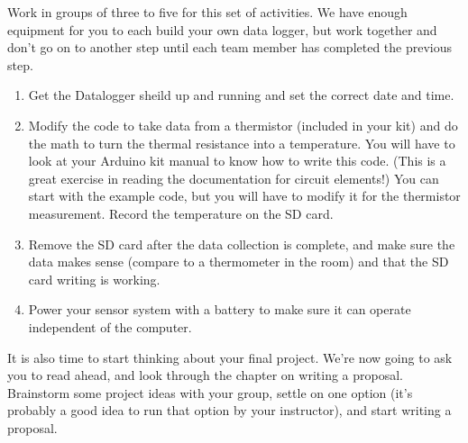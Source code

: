 \activity
{
Work in groups of three to five for this set of activities. We have enough 
equipment for you to each build your own data logger, but work together and 
don't go on to another step until each team member has completed the previous 
step.
\begin{enumerate}
\item Get the Datalogger sheild up and running and set the correct date and 
	time.
\item Modify the code to take data from a thermistor (included in your kit) 
and do the math to turn the thermal resistance into a temperature. You will 
have to look at your Arduino kit manual to know how to write this code. (This 
is a great exercise in reading the documentation for circuit elements!) You 
can start with the example code, but you will have to modify it for the 
thermistor measurement. Record the temperature on the SD card.
	
\item Remove the SD card after the data collection is complete, and make sure 
	the data makes sense (compare to a thermometer in the room) and that 
	the SD card writing is working.
		
\item Power your sensor system with a battery to make sure it can operate 
	independent of the computer.
		
\end{enumerate}
}

\activity
{
	It is also time to start thinking about your final project. We're now
	going to ask you to read ahead, and look through the chapter on 
	writing a proposal. Brainstorm some project ideas with your group,
	settle on one option (it's probably a good idea to run that option
	by your instructor), and start writing a proposal.
}

